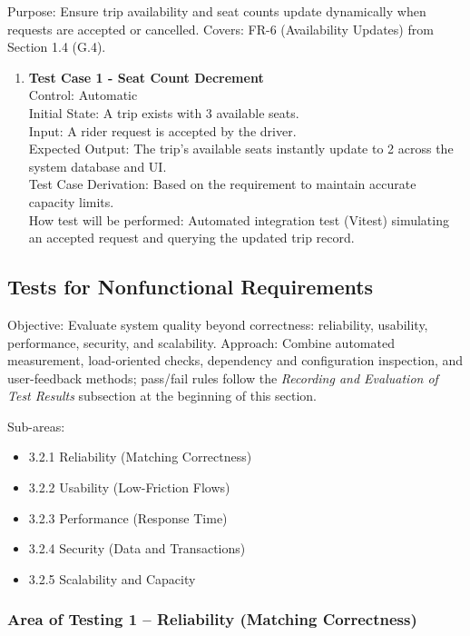 \documentclass[12pt, titlepage]{article}
\begin{document}
Purpose: Ensure trip availability and seat counts update dynamically when requests are accepted or cancelled.  
Covers: FR-6 (Availability Updates) from Section 1.4 (G.4).

\begin{enumerate}
\item \textbf{Test Case 1 - Seat Count Decrement}\\
Control: Automatic\\
Initial State: A trip exists with 3 available seats.\\
Input: A rider request is accepted by the driver.\\
Expected Output: The trip's available seats instantly update to 2 across the system database and UI.\\
Test Case Derivation: Based on the requirement to maintain accurate capacity limits.\\
How test will be performed: Automated integration test (Vitest) simulating an accepted request and querying the updated trip record.\\
\end{enumerate}

\subsection{Tests for Nonfunctional Requirements}

Objective: Evaluate system quality beyond correctness: reliability, usability, performance, security, and scalability.  
Approach: Combine automated measurement, load-oriented checks, dependency and configuration inspection, and user-feedback methods; pass/fail rules follow the \textit{Recording and Evaluation of Test Results} subsection at the beginning of this section.

Sub-areas:
\begin{itemize}
    \item 3.2.1 Reliability (Matching Correctness)
    \item 3.2.2 Usability (Low-Friction Flows)
    \item 3.2.3 Performance (Response Time)
    \item 3.2.4 Security (Data and Transactions)
    \item 3.2.5 Scalability and Capacity
\end{itemize}

\subsubsection{Area of Testing 1 – Reliability (Matching Correctness)}
\end{document}
